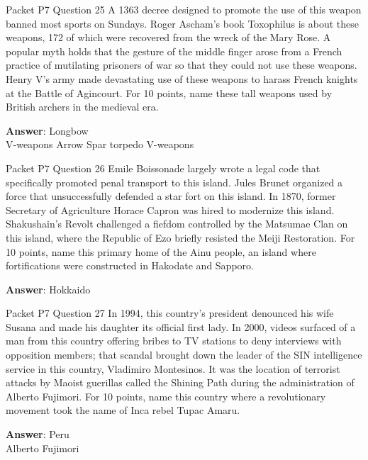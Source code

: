 \begin{frame}{Packet P7 Question 25}
A 1363 decree designed to promote the use of this weapon banned most sports on Sundays. Roger Ascham's book Toxophilus is about these weapons, 172 of which were recovered from the wreck of the Mary Rose. A popular myth holds that the gesture of the middle finger arose from a French practice of mutilating prisoners of war so that they could not use these weapons. Henry V's army made devastating use of these weapons to harass   French knights at the Battle of Agincourt. For 10 points, name these tall   weapons used by British archers in the medieval era.      

\textbf{Answer}: Longbow\\
 V-weapons
 Arrow
 Spar torpedo
 V-weapons
\end{frame}

\begin{frame}{Packet P7 Question 26}
Emile Boissonade largely wrote a legal code that specifically promoted penal transport to this island. Jules Brunet organized a force that unsuccessfully defended a star fort on this island. In 1870, former Secretary of Agriculture Horace Capron was hired to modernize   this island. Shakushain’s Revolt challenged a fiefdom controlled by the Matsumae Clan on this island, where the Republic   of Ezo briefly   resisted the Meiji Restoration. For 10 points, name this primary home of the Ainu people, an island   where fortifications were constructed in Hakodate and Sapporo.

\textbf{Answer}: Hokkaido\\
\end{frame}

\begin{frame}{Packet P7 Question 27}
In 1994, this country’s president denounced his wife Susana and made his daughter its official first lady. In 2000, videos surfaced of a man from this country offering bribes to TV stations to deny interviews with opposition members; that scandal brought down the leader of the SIN intelligence service in this country, Vladimiro   Montesinos.     It was the location of terrorist attacks by Maoist guerillas   called the Shining Path during the administration   of Alberto Fujimori. For 10 points, name this country where a revolutionary movement took the name of Inca rebel Tupac Amaru.

\textbf{Answer}: Peru\\
 Alberto Fujimori
\end{frame}


